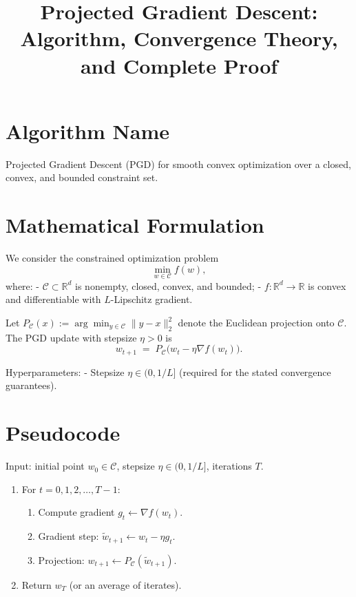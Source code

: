 \documentclass[11pt]{article}
\title{Projected Gradient Descent: Algorithm, Convergence Theory, and Complete Proof}
\author{}
\date{}
\begin{document}
\maketitle

\section*{Algorithm Name}
Projected Gradient Descent (PGD) for smooth convex optimization over a closed, convex, and bounded constraint set.

\section*{Mathematical Formulation}
We consider the constrained optimization problem
\[
\min_{w \in \mathcal{C}} f(w),
\]
where:
- $\mathcal{C}\subset \mathbb{R}^d$ is nonempty, closed, convex, and bounded;
- $f:\mathbb{R}^d \to \mathbb{R}$ is convex and differentiable with $L$-Lipschitz gradient.

Let $P_{\mathcal{C}}(x) := \arg\min_{y\in\mathcal{C}} \|y-x\|_2^2$ denote the Euclidean projection onto $\mathcal{C}$. The PGD update with stepsize $\eta>0$ is
\[
w_{t+1} \;=\; P_{\mathcal{C}}\bigl(w_t - \eta \nabla f(w_t)\bigr).
\]

Hyperparameters:
- Stepsize $\eta \in (0,1/L]$ (required for the stated convergence guarantees).

\section*{Pseudocode}
Input: initial point $w_0 \in \mathcal{C}$, stepsize $\eta \in (0,1/L]$, iterations $T$.
\begin{enumerate}
\item For $t=0,1,2,\dots,T-1$:
\begin{enumerate}
\item Compute gradient $g_t \leftarrow \nabla f(w_t)$.
\item Gradient step: $\tilde{w}_{t+1} \leftarrow w_t - \eta g_t$.
\item Projection: $w_{t+1} \leftarrow P_{\mathcal{C}}(\tilde{w}_{t+1})$.
\end{enumerate}
\item Return $w_T$ (or an average of iterates).
\end{enumerate}
\end{document}

